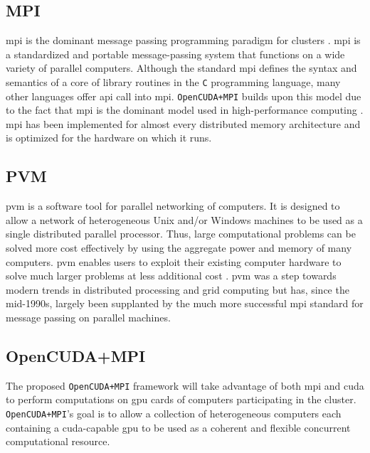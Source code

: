 \subsection{MPI}

\Gls{mpi} is the dominant message passing programming paradigm for clusters
\cite{website:Message-Passing-Interface-Forum}
\cite{website:Message-Passing-Interface}. \gls{mpi} is a standardized and
portable message-passing system that functions on a wide variety of parallel
computers. Although the standard \gls{mpi} defines the syntax and semantics of
a core of library routines in the \texttt{C} programming language, many other
languages offer \gls{api} call into \gls{mpi}. \texttt{OpenCUDA+MPI} builds
upon this model due to the fact that \gls{mpi} is the dominant model used in
high-performance computing \cite{sur2006high}. \Gls{mpi} has been implemented
for almost every distributed memory architecture and is optimized for the
hardware on which it runs.

\subsection{PVM}

\Gls{pvm} is a software tool for parallel networking of computers. It is
designed to allow a network of heterogeneous Unix and/or Windows machines to be
used as a single distributed parallel processor. Thus, large computational
problems can be solved more cost effectively by using the aggregate power and
memory of many computers. \gls{pvm} enables users to exploit their existing
computer hardware to solve much larger problems at less additional cost
\cite{website:Computer-Science-and-Division}. \gls{pvm} was a step towards
modern trends in distributed processing and grid computing but has, since the
mid-1990s, largely been supplanted by the much more successful \gls{mpi}
standard for message passing on parallel machines.

\subsection{OpenCUDA+MPI}

The proposed \texttt{OpenCUDA+MPI} framework will take advantage of both
\gls{mpi} and \gls{cuda} to perform computations on \gls{gpu} cards of
computers participating in the cluster. \texttt{OpenCUDA+MPI}'s goal is to
allow a collection of heterogeneous computers each containing a
\gls{cuda}-capable \gls{gpu} to be used as a coherent and flexible concurrent
computational resource.
